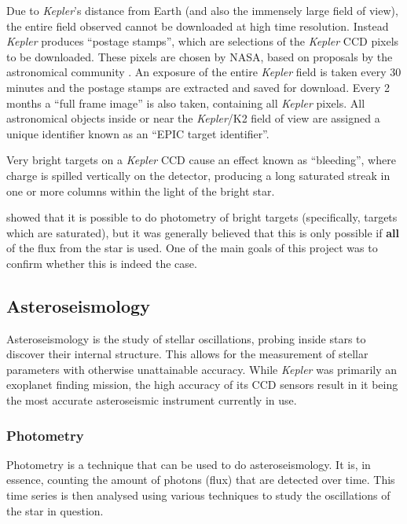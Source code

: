 \documentclass{book}
\begin{document}
Due to \textit{Kepler}'s distance from Earth (and also the immensely large field
of view), the entire field observed cannot be downloaded at high time resolution.
Instead \textit{Kepler} produces ``postage stamps'', which are selections of the
\textit{Kepler} CCD pixels to be downloaded. These pixels are chosen by NASA,
based on proposals by the astronomical community \citep{NASA.PROPOSALS}. An
exposure of the entire \textit{Kepler} field is taken every 30 minutes and the
postage stamps are extracted and saved for download. Every 2 months a
``full frame image'' is also taken, containing all \textit{Kepler} pixels. All
astronomical objects inside or near the \textit{Kepler}/K2 field of view are
assigned a unique identifier known as an ``EPIC target identifier''.

Very bright targets on a \textit{Kepler} CCD cause an effect known as ``bleeding'',
where charge is spilled vertically on the detector, producing a long saturated
streak in one or more columns within the light of the bright star.

\citet{2011MNRAS.411..878K} showed that it is possible to do photometry of bright
targets (specifically, targets which are saturated), but it was generally
believed that this is only possible if \textbf{all} of the flux from the star is
used. One of the main goals of this project was to confirm whether this is indeed
the case.

\subsection{Asteroseismology}

Asteroseismology is the study of stellar oscillations, probing inside stars to
discover their internal structure. This allows for the measurement of stellar
parameters with otherwise unattainable accuracy. While \textit{Kepler} was
primarily an exoplanet finding mission, the high accuracy of its CCD sensors
result in it being the most accurate asteroseismic instrument currently in use.

\subsubsection{Photometry}
\label{section:photometry}

Photometry is a technique that can be used to do asteroseismology. It is, in
essence, counting the amount of photons (flux) that are detected over time. This
time series is then analysed using various techniques to study the oscillations
of the star in question.
\end{document}
